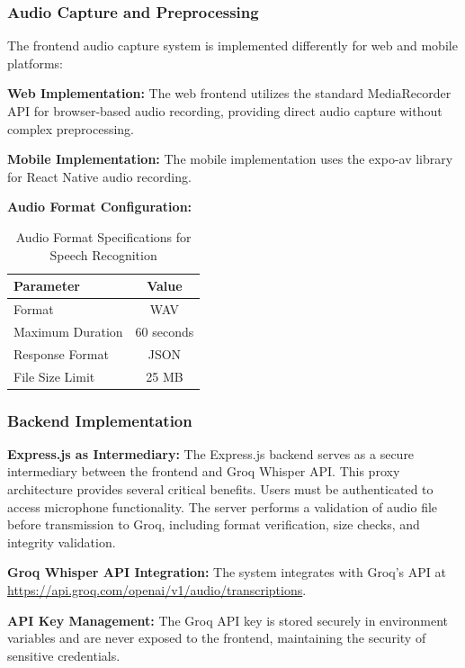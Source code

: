 \documentclass[12pt,a4paper]{article}
\begin{document}
\subsubsection{Audio Capture and Preprocessing}

The frontend audio capture system is implemented differently for web and mobile platforms:

\textbf{Web Implementation:}
The web frontend utilizes the standard MediaRecorder API for browser-based audio recording, providing direct audio capture without complex preprocessing.

\textbf{Mobile Implementation:}
The mobile implementation uses the expo-av library for React Native audio recording.

\textbf{Audio Format Configuration:}
\begin{table}[H]
\centering
\begin{tabular}{|l|c|}
\hline
\textbf{Parameter} & \textbf{Value} \\
\hline
Format & WAV \\
\hline
Maximum Duration & 60 seconds \\
\hline
Response Format & JSON \\
\hline
File Size Limit & 25 MB \\
\hline
\end{tabular}
\caption{Audio Format Specifications for Speech Recognition}
\end{table}

\subsubsection{Backend Implementation}

\textbf{Express.js as Intermediary:}
The Express.js backend serves as a secure intermediary between the frontend and Groq Whisper API. This proxy architecture provides several critical benefits. Users must be authenticated to access microphone functionality. The server performs a validation of audio file before transmission to Groq, including format verification, size checks, and integrity validation.

\textbf{Groq Whisper API Integration:}
The system integrates with Groq's API at \url{https://api.groq.com/openai/v1/audio/transcriptions}. 


\textbf{API Key Management:}
The Groq API key is stored securely in environment variables and are never exposed to the frontend, maintaining the security of sensitive credentials.
\end{document}
